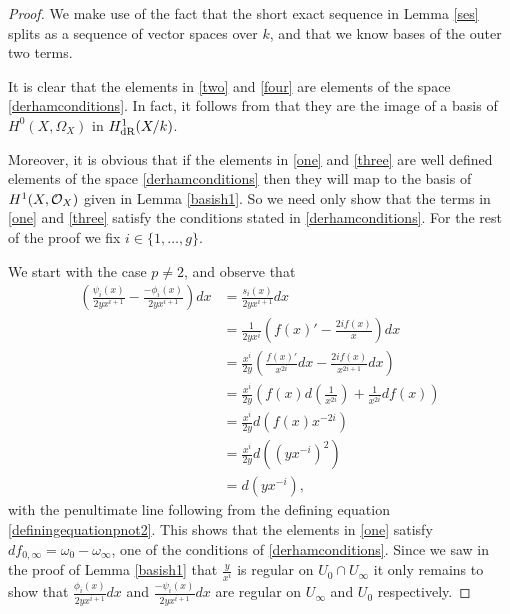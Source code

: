     \begin{proof}
    We make use of the fact that the short exact sequence in Lemma \ref{ses} splits as a sequence of vector spaces over $k$, and that we know bases of the outer two terms.
    
    It is clear that the elements in \eqref{two} and \eqref{four} are elements of the space \eqref{derhamconditions}. 
    In fact, it follows from \cite[Thm. 6.1]{faithfulaction} that they are the image of a basis of $H^0(X,\Omega_X)$ in $H_{\text {dR}}^1(X/k)$.
    
    Moreover, it is obvious that if the elements in \eqref{one} and \eqref{three} are well defined elements of the space \eqref{derhamconditions} then they will map to the basis of $H^1(X,\mathcal{O}_X)$ given in Lemma \ref{basish1}.
    So we need only show that the terms in \eqref{one} and \eqref{three} satisfy the conditions stated in \eqref{derhamconditions}.
    For the rest of the proof we fix $i \in \{1, \ldots ,g\}$.
    
    
    We start with the case $p\neq 2$, and observe that
        \begin{align*}
        \left(  \frac{\psi_i(x)}{2yx^{i+1}}  - \frac{-\phi_i(x)}{2yx^{i+1}} \right) dx & =  \frac{s_i(x)}{2yx^{i+1}} dx \\
        & =  \frac{1}{2yx^i} \left( f(x)' - \frac{2if(x)}{x} \right) dx \\
        & =  \frac{x^i}{2y} \left( \frac{f(x)'}{x^{2i}}dx -\frac{2if(x)}{x^{2i+1}} dx \right) \\
        & =  \frac{x^i}{2y} \left( f(x)d\left(\frac{1}{x^{2i}}\right) + \frac{1}{x^{2i}}df(x) \right) \\
        & =  \frac{x^i}{2y}d(f(x)x^{-2i}) \\
        & =  \frac{x^i}{2y} d\left(\left(yx^{-i}\right)^2\right) \\
        & =  d(yx^{-i}),
        \end{align*}
    with the penultimate line following from the defining equation \eqref{definingequationpnot2}.
    This shows that the elements in \eqref{one} satisfy $df_{0, \infty} = \omega_0 - \omega_\infty$, one of the conditions of \eqref{derhamconditions}.
    Since we saw in the proof of Lemma \ref{basish1} that $\frac{y}{x^i}$ is regular on $U_0\cap U_\infty$ it only remains to show that $\frac{\phi_i(x)}{2yx^{i+1}}dx$ and $\frac{-\psi_i(x)}{2yx^{i+1}}dx$ are regular on $U_\infty$ and $U_0$ respectively.
    

\end{proof}
